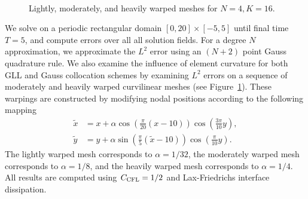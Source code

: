 \documentclass[onefignum,onetabnum,final]{siamart171218}
\renewcommand{\tilde}{\widetilde}
\newcommand{\LRp}[1]{\left( #1 \right)}
\begin{document}
\begin{figure}
\centering
{}
\hspace{1em}
\\
\caption{Lightly, moderately, and heavily warped meshes for $N=4, K= 16$.  }
\label{fig:warp2d}
\end{figure}

We solve on a periodic rectangular domain $[0, 20] \times [-5,5]$ until final time $T=5$, and compute errors over all all solution fields.  For a degree $N$ approximation, we approximate the $L^2$ error using an $(N+2)$ point Gauss quadrature rule.  We also examine the influence of element curvature for both GLL and Gauss collocation schemes by examining $L^2$ errors on a sequence of moderately and heavily warped curvilinear meshes (see Figure~\ref{fig:warp2d}).  These warpings are constructed by modifying nodal positions according to the following mapping
\begin{align*}
\tilde{x} &= x + \alpha\cos\LRp{\frac{\pi}{20}(x-10)}\cos\LRp{\frac{3\pi}{10}y}, \\
\tilde{y} &= y + \alpha\sin\LRp{\frac{\pi}{5}(\tilde{x}-10)}\cos\LRp{\frac{\pi}{10}y}.
\end{align*}
The lightly warped mesh corresponds to $\alpha = 1/32$, the moderately warped mesh corresponds to $\alpha = 1/8$, and the heavily warped mesh corresponds to $\alpha = 1/4$.  All results are computed using $C_{\rm CFL} = 1/2$ and Lax-Friedrichs interface dissipation.  
\end{document}
